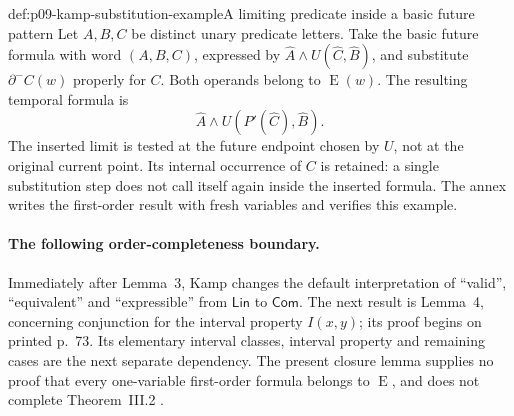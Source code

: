 \begin{hbexample}{def:p09-kamp-substitution-example}{A limiting predicate inside a basic future pattern}
Let \(A,B,C\) be distinct unary predicate letters. Take the basic future
formula with word \((A,B,C)\), expressed by
\(\widehat A\land U(\widehat C,\widehat B)\), and substitute
\(\partial^-C(w)\) properly for \(C\). Both operands belong to
\(\operatorname{E}(w)\). The resulting temporal formula is
\[
                  \widehat A\land U(P'(\widehat C),\widehat B).
\]
The inserted limit is tested at the future endpoint chosen by \(U\),
not at the original current point. Its internal occurrence of \(C\)
is retained: a single substitution step does not call itself again inside
the inserted formula. The annex writes the first-order result with fresh
variables and verifies this example.
\end{hbexample}

\paragraph{The following order-completeness boundary.}
Immediately after Lemma~3, Kamp changes the default interpretation of
``valid'', ``equivalent'' and ``expressible'' from \(\mathsf{Lin}\) to
\(\mathsf{Com}\). The next result is Lemma~4, concerning conjunction
for the interval property \(I(x,y)\); its proof begins on printed p.~73.
Its elementary interval classes, interval property and remaining cases
are the next separate dependency. The present closure lemma supplies no
proof that every one-variable first-order formula belongs to
\(\operatorname{E}\), and does not complete Theorem~III.2
\cite[ch.~III, pp.~67--68, 73]{Kamp1968}.
